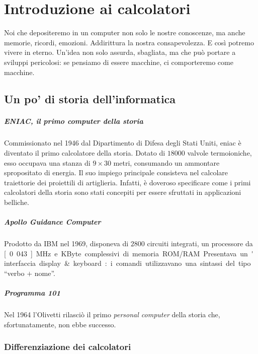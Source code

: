 \documentclass[class=book, crop=false, oneside]{standalone}
\begin{document}
\chapter{Introduzione ai calcolatori}\begin{fquote}Noi che depositeremo in un computer non solo le nostre conoscenze, ma anche memorie, ricordi, emozioni. Addirittura la nostra consapevolezza. E così potremo vivere in eterno. Un'idea non solo assurda, sbagliata, ma che può portare a sviluppi pericolosi: se pensiamo di essere macchine, ci comporteremo come macchine.\end{fquote}

\section{Un po' di storia dell'informatica}

\paragraph{ENIAC, il primo computer della storia}
Commissionato nel 1946 dal Dipartimento di Difesa degli Stati Uniti, \acrfull{eniac} è diventato il primo calcolatore della storia.
Dotato di \(18000\) valvole termoioniche, esso occupava una stanza di \(9 \times 30\) metri, consumando un ammontare spropositato di energia.
Il suo impiego principale consisteva nel calcolare traiettorie dei proiettili di artiglieria.
Infatti, è doveroso specificare come i primi calcolatori della storia sono stati concepiti per essere sfruttati in applicazioni belliche.

\paragraph{Apollo Guidance Computer}
Prodotto da IBM nel 1969, disponeva di \(2800\) circuiti integrati, un processore da \unit[0.043]{MHz} e \unit[152]{KByte} complessivi di memoria ROM/RAM.
Presentava un'interfaccia display \& keyboard: i comandi utilizzavano una sintassi del tipo \enquote{verbo \(+\) nome}.

\paragraph{Programma 101}
Nel 1964 l'Olivetti rilasciò il primo \emph{personal computer} della storia che, sfortunatamente, non ebbe successo.

\subsection{Differenziazione dei calcolatori}
\end{document}
